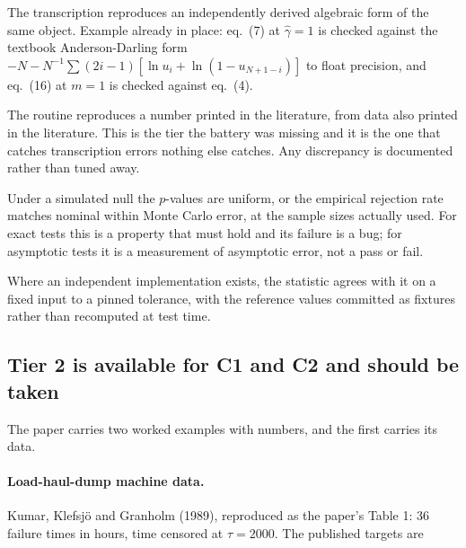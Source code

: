 \documentclass[11pt,a4paper]{article}
\newcommand{\gh}{\hat\gamma}
\begin{document}
\begin{description}[leftmargin=1.8em,itemsep=4pt]
\item[Tier 1, internal identity.] The transcription reproduces an independently derived
algebraic form of the same object. Example already in place: eq.~(7) at $\gh=1$ is
checked against the textbook Anderson-Darling form
$-N - N^{-1}\sum(2i-1)[\ln u_i + \ln(1-u_{N+1-i})]$ to float precision, and eq.~(16) at
$m=1$ is checked against eq.~(4).

\item[Tier 2, published reference value.] The routine reproduces a number printed in the
literature, from data also printed in the literature. This is the tier the battery was
missing and it is the one that catches transcription errors nothing else catches. Any
discrepancy is documented rather than tuned away.

\item[Tier 3, null calibration.] Under a simulated null the $p$-values are uniform, or
the empirical rejection rate matches nominal within Monte Carlo error, at the sample
sizes actually used. For exact tests this is a property that must hold and its failure is
a bug; for asymptotic tests it is a measurement of asymptotic error, not a pass or fail.

\item[Tier 4, cross-implementation.] Where an independent implementation exists, the
statistic agrees with it on a fixed input to a pinned tolerance, with the reference values
committed as fixtures rather than recomputed at test time.
\end{description}

\subsection{Tier 2 is available for C1 and C2 and should be taken}

The paper carries two worked examples with numbers, and the first carries its data.

\paragraph{Load-haul-dump machine data.} Kumar, Klefsjö and Granholm (1989), reproduced
as the paper's Table 1: 36 failure times in hours, time censored at $\tau=2000$. The
published targets are
\end{document}
